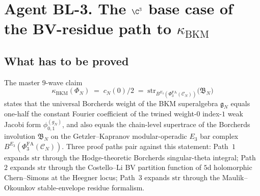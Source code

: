 
\providecommand{\PhiFA}{\Phi^{\mathrm{FA}}}
\providecommand{\SpCh}{\mathrm{Sp}^{\mathrm{ch}}}
\providecommand{\BV}{\mathrm{BV}}
\providecommand{\Obs}{\mathrm{Obs}}
\providecommand{\CoHA}{\mathrm{CoHA}}
\providecommand{\Hilb}{\mathrm{Hilb}}
\providecommand{\kBKM}{\kappa_{\mathrm{BKM}}}
\providecommand{\kch}{\kappa_{\mathrm{ch}}}
\providecommand{\kchBV}{\kappa_{\mathrm{ch,BV}}}
\providecommand{\ghat}{\widehat{\mathfrak{gl}}_1}
\providecommand{\frakg}{\mathfrak{g}}
\providecommand{\ChirAlg}{\mathrm{ChirAlg}}

\section*{Agent BL-3. The $\C^3$ base case of the BV-residue path to $\kBKM$}
\label{sec:wave-bl-agent-bl-3-bv-c3}

\subsection*{What has to be proved}

The master $9$-wave claim
\[
  \kBKM(\Phi_N) \;=\; c_N(0)/2 \;=\;
  \mathrm{str}_{B^{E_3}(\PhiFA_3(\mathcal{C}_N))}\bigl(\mathfrak{B}_N\bigr)
\]
states that the universal Borcherds weight of the BKM superalgebra
$\mathfrak{g}_N$ equals one-half the constant Fourier coefficient of
the twined weight-$0$ index-$1$ weak Jacobi form $\phi_{0,1}^{(g_N)}$,
and also equals the chain-level supertrace of the Borcherds involution
$\mathfrak{B}_N$ on the Getzler--Kapranov modular-operadic $E_3$ bar
complex $B^{E_3}(\PhiFA_3(\mathcal{C}_N))$. Three proof paths pair
against this statement: Path~$1$ expands $\mathrm{str}$ through the
Hodge-theoretic Borcherds singular-theta integral; Path~$2$ expands
$\mathrm{str}$ through the Costello--Li BV partition function of
$5$d holomorphic Chern--Simons at the Heegner locus; Path~$3$ expands
$\mathrm{str}$ through the Maulik--Okounkov stable-envelope
residue formalism.

